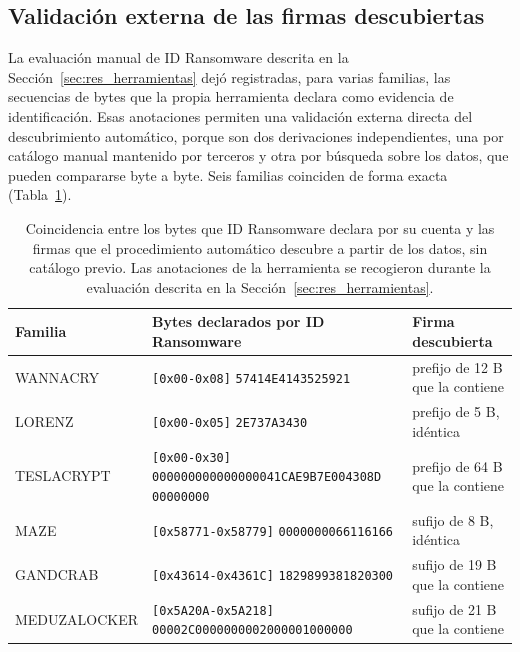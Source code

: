 \subsection{Validación externa de las firmas descubiertas}
\label{subsec:exp2b_validacion}

La evaluación manual de ID Ransomware descrita en la Sección~\ref{sec:res_herramientas} dejó registradas, para varias familias, las secuencias de bytes que la propia herramienta declara como evidencia de identificación. Esas anotaciones permiten una validación externa directa del descubrimiento automático, porque son dos derivaciones independientes, una por catálogo manual mantenido por terceros y otra por búsqueda sobre los datos, que pueden compararse byte a byte. Seis familias coinciden de forma exacta (Tabla~\ref{tab:exp2b_validacion}).

\begin{table}[ht]
\centering
\small
\caption{Coincidencia entre los bytes que ID Ransomware declara por su cuenta y las firmas que el procedimiento automático descubre a partir de los datos, sin catálogo previo. Las anotaciones de la herramienta se recogieron durante la evaluación descrita en la Sección~\ref{sec:res_herramientas}.}
\label{tab:exp2b_validacion}
\footnotesize
\begin{tabular}{|l|p{6.0cm}|l|}
\hline
\textbf{Familia} & \textbf{Bytes declarados por ID Ransomware} & \textbf{Firma descubierta} \\
\hline
WANNACRY & \texttt{[0x00-0x08]} \newline \texttt{57414E4143525921} & prefijo de 12 B que la contiene \\
\hline
LORENZ & \texttt{[0x00-0x05]} \newline \texttt{2E737A3430} & prefijo de 5 B, idéntica \\
\hline
TESLACRYPT & \texttt{[0x00-0x30]} \newline \texttt{000000000000000041CAE9B7E004308D} \newline \texttt{00000000} & prefijo de 64 B que la contiene \\
\hline
MAZE & \texttt{[0x58771-0x58779]} \newline \texttt{0000000066116166} & sufijo de 8 B, idéntica \\
\hline
GANDCRAB & \texttt{[0x43614-0x4361C]} \newline \texttt{1829899381820300} & sufijo de 19 B que la contiene \\
\hline
MEDUZALOCKER & \texttt{[0x5A20A-0x5A218]} \newline \texttt{00002C0000000002000001000000} & sufijo de 21 B que la contiene \\
\hline
\end{tabular}
\end{table}

